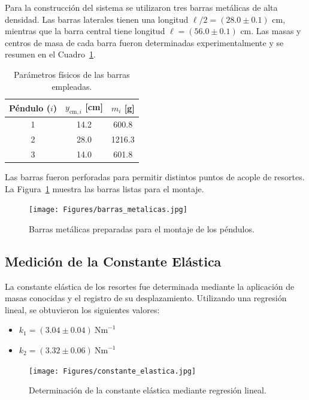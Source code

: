 Para la construcción del sistema se utilizaron tres barras metálicas de alta densidad. Las barras laterales tienen una longitud $\ell/2 = (28.0 \pm 0.1)$ cm, mientras que la barra central tiene longitud $\ell = (56.0 \pm 0.1)$ cm. Las masas y centros de masa de cada barra fueron determinadas experimentalmente y se resumen en el Cuadro~\ref{tab:parametros}.

\begin{table}[h!]
    \centering
    \caption{Parámetros físicos de las barras empleadas.}
    \label{tab:parametros}
    \begin{tabular}{c c c}
        \toprule
        Péndulo ($i$) & $y_{\text{cm},i}$ [cm] & $m_i$ [g] \\
        \midrule
        1 & 14.2 & 600.8 \\
        2 & 28.0 & 1216.3 \\
        3 & 14.0 & 601.8 \\
        \bottomrule
    \end{tabular}
\end{table}

Las barras fueron perforadas para permitir distintos puntos de acople de resortes. La Figura~\ref{fig:barras} muestra las barras listas para el montaje.

\begin{figure}[h!]
    \centering
    \texttt{[image: Figures/barras\_metalicas.jpg]}
    \caption{Barras metálicas preparadas para el montaje de los péndulos.}
    \label{fig:barras}
\end{figure}

\subsection{Medición de la Constante Elástica}

La constante elástica de los resortes fue determinada mediante la aplicación de masas conocidas y el registro de su desplazamiento. Utilizando una regresión lineal, se obtuvieron los siguientes valores:

\begin{itemize}
    \item $k_1 = (3.04 \pm 0.04)~\mathrm{Nm}^{-1}$
    \item $k_2 = (3.32 \pm 0.06)~\mathrm{Nm}^{-1}$
\end{itemize}

\begin{figure}[h!]
    \centering
    \texttt{[image: Figures/constante\_elastica.jpg]}
    \caption{Determinación de la constante elástica mediante regresión lineal.}
    \label{fig:regresion}
\end{figure}

